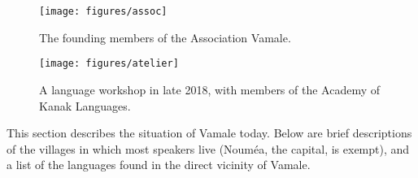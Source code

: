 \begin{figure}
	\centering
		\texttt{[image: figures/assoc]}
		\caption{The founding members of the Association Vamale.}
		\label{fig:assoc}
\end{figure}

	\begin{figure}
	\centering
	\texttt{[image: figures/atelier]}
	\caption{A language workshop in late 2018, with members of the Academy of Kanak Languages.}
	\label{fig:workshop}
\end{figure}

 This section describes the situation of Vamale today. Below are brief descriptions of the villages in which most speakers live (Nouméa, the capital, is exempt), and a list of the languages found in the direct vicinity of Vamale. %


